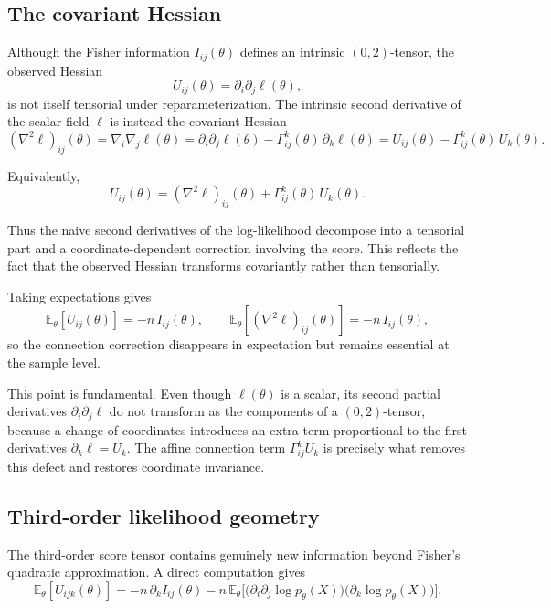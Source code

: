 \documentclass[11pt,letterpaper]{amsart}
\numberwithin{equation}{section}
\theoremstyle{plain}
\theoremstyle{definition}
\theoremstyle{remark}
\begin{document}
\subsection{The covariant Hessian}

Although the Fisher information \(I_{ij}(\theta)\) defines an intrinsic \((0,2)\)-tensor, the observed Hessian
\[
U_{ij}(\theta)=\partial_i\partial_j\ell(\theta),
\]
is not itself tensorial under reparameterization. The intrinsic second derivative of the scalar field \(\ell\) is instead the covariant Hessian
\begin{equation*}
(\nabla^2\ell)_{ij}(\theta)
=
\nabla_i\nabla_j \ell(\theta)
=
\partial_i\partial_j \ell(\theta)
-
\Gamma^{k}_{ij}(\theta)\,\partial_k\ell(\theta)
=
U_{ij}(\theta)-\Gamma^{k}_{ij}(\theta)\,U_k(\theta).
\end{equation*}

Equivalently,
\begin{equation*}
U_{ij}(\theta)
=
(\nabla^2\ell)_{ij}(\theta)
+
\Gamma^{k}_{ij}(\theta)\,U_k(\theta).
\end{equation*}

Thus the naive second derivatives of the log-likelihood decompose into a tensorial part and a coordinate-dependent correction involving the score. This reflects the fact that the observed Hessian transforms covariantly rather than tensorially.

Taking expectations gives
\begin{equation*}
\mathbb E_\theta[U_{ij}(\theta)]
=
-n\,I_{ij}(\theta),
\qquad
\mathbb E_\theta[(\nabla^2\ell)_{ij}(\theta)]
=
-n\,I_{ij}(\theta),
\end{equation*}
so the connection correction disappears in expectation but remains essential at the sample level.

This point is fundamental. Even though \(\ell(\theta)\) is a scalar, its second partial derivatives \(\partial_i\partial_j\ell\) do not transform as the components of a \((0,2)\)-tensor, because a change of coordinates introduces an extra term proportional to the first derivatives \(\partial_k\ell=U_k\). The affine connection term \(\Gamma^{k}_{ij}U_k\) is precisely what removes this defect and restores coordinate invariance.

\subsection{Third-order likelihood geometry}

The third-order score tensor contains genuinely new information beyond Fisher's quadratic approximation. A direct computation gives
\begin{equation*}
\mathbb{E}_\theta[U_{ijk}(\theta)]
=
-n\,\partial_k I_{ij}(\theta)
-
n\,\mathbb{E}_\theta\!\Big[
\big(\partial_i\partial_j \log p_\theta(X)\big)
\big(\partial_k \log p_\theta(X)\big)
\Big].
\end{equation*}
\end{document}

